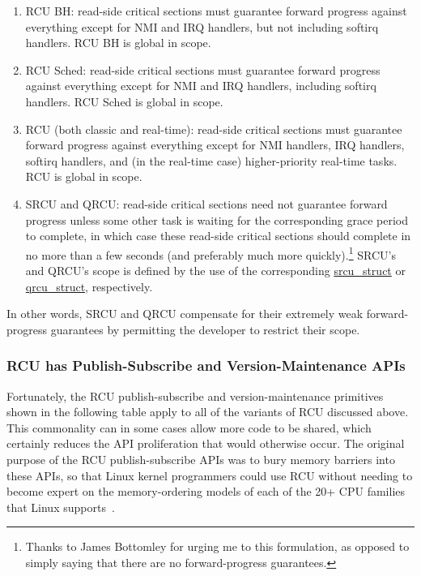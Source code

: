 \begin{enumerate}
\item	RCU BH: read-side critical sections
	must guarantee forward progress against everything except for
	NMI and IRQ handlers, but not including softirq handlers.
	RCU BH is global in scope.
\item	RCU Sched: read-side critical sections must guarantee forward
	progress against everything except for NMI and IRQ handlers,
	including softirq handlers.
	RCU Sched is global in scope.
\item	RCU (both classic and real-time): read-side critical sections
	must guarantee forward progress against everything except for
	NMI handlers, IRQ handlers, softirq handlers, and (in the
	real-time case) higher-priority real-time tasks.
	RCU is global in scope.
\item	SRCU and QRCU: read-side critical sections need not guarantee
	forward progress unless some other task is waiting for the
	corresponding grace period to complete, in which case these
	read-side critical sections should complete in no more than
	a few seconds (and preferably much more quickly).\footnote{
		Thanks to James Bottomley for urging me to this
		formulation, as opposed to simply saying that
		there are no forward-progress guarantees.}
	SRCU's and QRCU's scope is defined by the use of the corresponding
	\url{srcu_struct} or \url{qrcu_struct}, respectively.
\end{enumerate}

In other words, SRCU and QRCU compensate for their extremely weak
forward-progress guarantees by permitting the developer to restrict
their scope.

\subsubsection{RCU has Publish-Subscribe and Version-Maintenance APIs}
\label{sec:defer:RCU has Publish-Subscribe and Version-Maintenance APIs}

Fortunately, the RCU publish-subscribe and version-maintenance
primitives shown in the following
table apply to all of the variants of RCU discussed above.
This commonality can in some cases allow more code to be shared,
which certainly reduces the API proliferation that would otherwise
occur.
The original purpose of the RCU publish-subscribe APIs was to
bury memory barriers into these APIs, so that Linux kernel
programmers could use RCU without needing to become expert on
the memory-ordering models of each of the 20+ CPU families
that Linux supports~\cite{Spraul01}.

